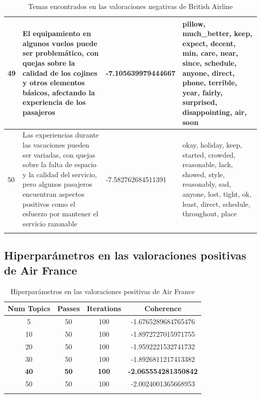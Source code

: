 \documentclass{report}
\begin{document}
\begin{longtable}{|p{1cm}|p{4cm}|p{4cm}|p{6cm}|}
                    \hline
                    49 & El equipamiento en algunos vuelos puede ser problemático, con quejas sobre la calidad de los cojines y otros elementos básicos, afectando la experiencia de los pasajeros & -7.105639979444667 & pillow, much\_better, keep, expect, decent, min, care, near, since, schedule, anyone, direct, phone, terrible, year, fairly, surprised, disappointing, air, soon \\
                    \hline
                    50 & Las experiencias durante las vacaciones pueden ser variadas, con quejas sobre la falta de espacio y la calidad del servicio, pero algunos pasajeros encuentran aspectos positivos como el esfuerzo por mantener el servicio razonable & -7.582762684511391 & okay, holiday, keep, started, crowded, reasonable, lack, showed, style, reasonably, sad, anyone, lost, tight, ok, least, direct, schedule, throughout, place \\
                    \hline
                    \caption{Temas encontrados en las valoraciones negativas de British Airline}
                \end{longtable}
            \clearpage\subsection{Hiperparámetros en las valoraciones positivas de Air France}
                \label{tab:hiperparametros_air_france_positivas}
                \begin{longtable}{|c|c|c|c|}
                    \hline
                    \textbf{Num Topics} & \textbf{Passes} & \textbf{Iterations} & \textbf{Coherence} \\
                    \hline
                    5 & 50 & 100 & -1.6765289684765476 \\
                    \hline
                    10 & 50 & 100 & -1.8972727015971755 \\
                    \hline
                    20 & 50 & 100 & -1.9592221532741732 \\
                    \hline
                    30 & 50 & 100 & -1.8926811217413382 \\
                    \hline
                    \textbf{40} & \textbf{50} & \textbf{100} & \textbf{-2.065554281350842} \\
                    \hline
                    50 & 50 & 100 & -2.0024001365668953 \\
                    \hline
                    \caption{Hiperparámetros en las valoraciones positivas de Air France}
                \end{longtable}
\end{document}
